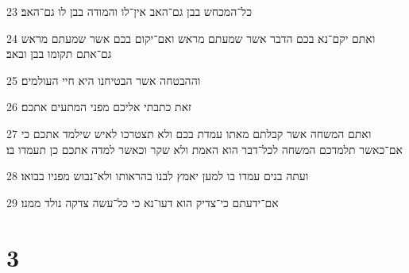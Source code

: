 \par 23 כל־המכחש בבן גם־האב אין־לו והמודה בבן לו גם־האב׃
\par 24 ואתם יקם־נא בכם הדבר אשר שמעתם מראש ואם־יקום בכם אשר שמעתם מראש גם־אתם תקומו בבן ובאב׃
\par 25 וההבטחה אשר הבטיחנו היא חיי העולמים׃
\par 26 זאת כתבתי אליכם מפני המתעים אתכם׃
\par 27 ואתם המשחה אשר קבלתם מאתו עמדת בכם ולא תצטרכו לאיש שילמד אתכם כי אם־כאשר תלמדכם המשחה לכל־דבר הוא האמת ולא שקר וכאשר למדה אתכם כן תעמדו בו׃
\par 28 ועתה בנים עמדו בו למען יאמץ לבנו בהראותו ולא־נבוש מפניו בבואו׃
\par 29 אם־ידעתם כי־צדיק הוא דעו־נא כי כל־עשה צדקה נולד ממנו׃

\chapter{3}

